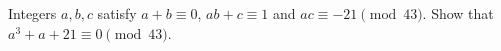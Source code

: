 Integers $a,b,c$ satisfy $a+b\equiv0$, $ab+c\equiv1$ and $ac\equiv-21\pmod{43}$. Show that $a^3+a+21\equiv0\pmod{43}$.
